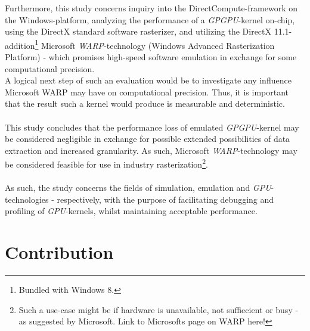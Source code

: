 \documentclass[fleqn,10pt]{SelfArx} %
\begin{document}
Furthermore, this study concerns inquiry into the DirectCompute-framework on the Windows-platform, analyzing the performance of a \textit{GPGPU}-kernel on-chip, using the DirectX standard software rasterizer, and utilizing the DirectX 11.1-addition\footnote{Bundled with Windows 8.} Microsoft \textit{WARP}-technology (Windows Advanced Rasterization Platform) - which promises high-speed software emulation in exchange for some computational precision. \\
A logical next step of such an evaluation would be to investigate any influence Microsoft WARP may have on computational precision. Thus, it is important that the result such a kernel would produce is measurable and deterministic. \\
\\
This study concludes that the performance loss of emulated \textit{GPGPU}-kernel may be considered negligible in exchange for possible extended possibilities of data extraction and increased granularity. As such, Microsoft \textit{WARP}-technology may be considered feasible for use in industry rasterization\footnote{Such a use-case might be if hardware is unavailable, not suffiecient or busy - as suggested by Microsoft. Link to Microsofts page on WARP here!}.\\
\\
As such, the study concerns the fields of simulation, emulation and \textit{GPU}-technologies - respectively, with the purpose of facilitating debugging and profiling of \textit{GPU}-kernels, whilst maintaining acceptable performance.

\section{Contribution}
\label{sec:contribution}

\end{document}
